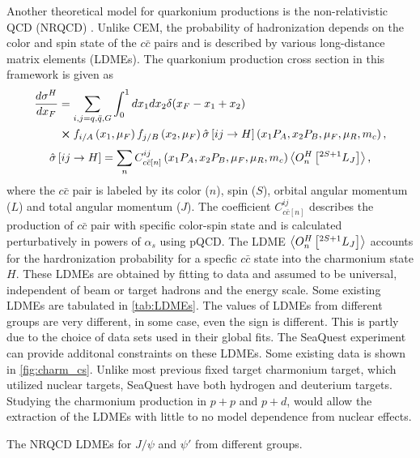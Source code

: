\documentclass[../main.tex]{subfiles}
\begin{document}
Another theoretical model for quarkonium productions is the non-relativistic
QCD (NRQCD) \cite{bodwin1995}. Unlike CEM, the probability of
hadronization depends on the color and spin state of the $c\bar{c}$ pairs and
is described by various long-distance matrix elements (LDMEs). The quarkonium
production cross section in this framework is given as
\begin{equation}
	\begin{split}
		\frac{d\sigma^H}{dx_F} &=\sum_{i,j = q,\bar{q},G}\int^1_0 dx_1 dx_2 \delta(x_F-x_1+x_2)\\
		&\cross f_{i/A}\left(x_1,\mu_F\right)f_{j/B}\left(x_2,\mu_F\right)\hat{\sigma}\left[ij\rightarrow H\right]\left(x_1P_A,x_2P_B,\mu_F,\mu_R , m_c\right),
	\end{split}
\end{equation}
\begin{equation}
	\hat{\sigma}\left[ij\rightarrow H\right]= \sum_n C^{ij}_{c\bar{c}\left[n\right]}\left(x_1P_A,x_2P_B,\mu_F,\mu_R , m_c\right)\expval{O^H_n \left[^{2S+1}L_J\right]},
\end{equation}
where the $c\bar{c}$ pair is labeled by its color ($n$), spin ($S$), orbital
angular momentum ($L$) and total angular momentum ($J$). The coefficient
$C^{ij}_{c\bar{c}\left[n\right]}$ describes the production of $c\bar{c}$ pair
with specific color-spin state and is calculated perturbatively in powers of
$\alpha_s$ using pQCD. The LDME $\expval{O^H_n \left[^{2S+1}L_J\right]}$ accounts
for the hardronization probability for a specfic $c\bar{c}$ state into the
charmonium state $H$. These LDMEs are obtained by fitting to data and assumed to
be universal, independent of beam or target hadrons and the energy scale. Some 
existing LDMEs are tabulated in \cref{tab:LDMEs}. The values of LDMEs from
different groups are very different, in some case, even the sign is different.
This is partly due to the choice of data sets used in their global fits. The
SeaQuest experiment can provide additonal constraints on these LDMEs. Some
existing data is shown in \cref{fig:charm_cs}.
Unlike most previous fixed target charmonium target, which utilized nuclear
targets, SeaQuest have both hydrogen and deuterium targets. 
Studying the charmonium production in $p+p$ and $p+d$, would allow the extraction
of the LDMEs with little to no model dependence from nuclear effects. 

\begin{table}[ht!]
	\centering
	\caption{The NRQCD LDMEs for $J/\psi$ and $\psi'$ from different groups.}
	\label{tab:LDMEs}
	\scalebox{0.82}{
		
	}
\end{table}
\end{document}
